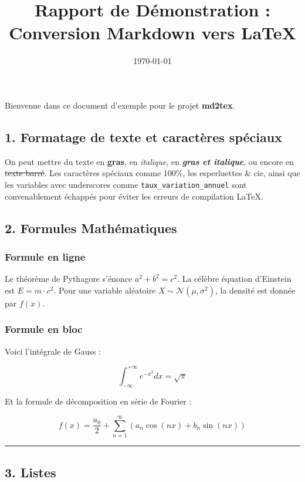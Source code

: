 \documentclass[11pt,a4paper]{article}
\title{Rapport de Démonstration : Conversion Markdown vers LaTeX}
\author{}
\date{\today}
\begin{document}
\maketitle
\vspace{1em}


Bienvenue dans ce document d'exemple pour le projet \textbf{md2tex}.

\subsection{1. Formatage de texte et caractères spéciaux}

On peut mettre du texte en \textbf{gras}, en \textit{italique}, en \textbf{\textit{gras et italique}}, ou encore en \sout{texte barré}.
Les caractères spéciaux comme 100\%, les esperluettes \& cie, ainsi que les variables avec underscores comme \texttt{taux\_variation\_annuel} sont convenablement échappés pour éviter les erreurs de compilation LaTeX.

\subsection{2. Formules Mathématiques}

\subsubsection{Formule en ligne}
Le théorème de Pythagore s'énonce $a^2 + b^2 = c^2$.
La célèbre équation d'Einstein est $E = m \cdot c^2$.
Pour une variable aléatoire $X \sim \mathcal{N}(\mu, \sigma^2)$, la densité est donnée par $f(x)$.

\subsubsection{Formule en bloc}
Voici l'intégrale de Gauss :

\begin{equation*}
\int_{-\infty}^{+\infty} e^{-x^2} dx = \sqrt{\pi}
\end{equation*}

Et la formule de décomposition en série de Fourier :

\begin{equation*}
f(x) = \frac{a_0}{2} + \sum_{n=1}^{\infty} \left( a_n \cos(nx) + b_n \sin(nx) \right)
\end{equation*}

\noindent\rule{\linewidth}{0.4pt}

\subsection{3. Listes}
\end{document}
